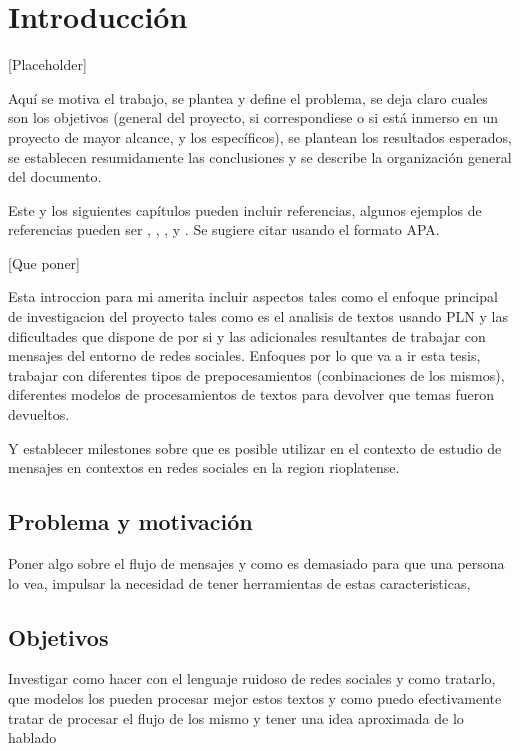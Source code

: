 \chapter{Introducción}

[Placeholder]

Aquí se motiva el trabajo, se plantea y define el problema, se deja claro cuales son los objetivos (general del proyecto, si correspondiese o si está inmerso en un proyecto de mayor alcance, y los específicos), se plantean los resultados esperados, se establecen resumidamente las conclusiones y se describe la
organización general del documento.

Este y los siguientes capítulos pueden incluir referencias, algunos ejemplos de referencias pueden ser \cite{CitekeyArticle}, \cite{CitekeyBook}, \cite{CitekeyInproceedings}, \cite{CitekeyManual} y \cite{CitekeyMisc}. Se sugiere citar usando el formato APA.

[Que poner]

Esta introccion para mi amerita incluir aspectos tales como el enfoque principal de investigacion del proyecto tales como es el analisis de textos usando PLN y las dificultades que dispone de por si y las adicionales resultantes de trabajar con mensajes del entorno de redes sociales.
Enfoques por lo que va a ir esta tesis, trabajar con diferentes tipos de prepocesamientos (conbinaciones de los mismos), diferentes modelos de procesamientos de textos para devolver que temas fueron devueltos.

Y establecer milestones sobre que es posible utilizar en el contexto de estudio de mensajes en contextos en redes sociales en la region rioplatense.

\section{Problema y motivación}

Poner algo sobre el flujo de mensajes y como es demasiado para que una persona lo vea, impulsar la necesidad de tener herramientas de estas caracteristicas, 

\section{Objetivos}

Investigar como hacer con el lenguaje ruidoso de redes sociales y como tratarlo, que modelos los pueden procesar mejor estos textos y como puedo efectivamente tratar de procesar el flujo de los mismo y tener una idea aproximada de lo hablado 
